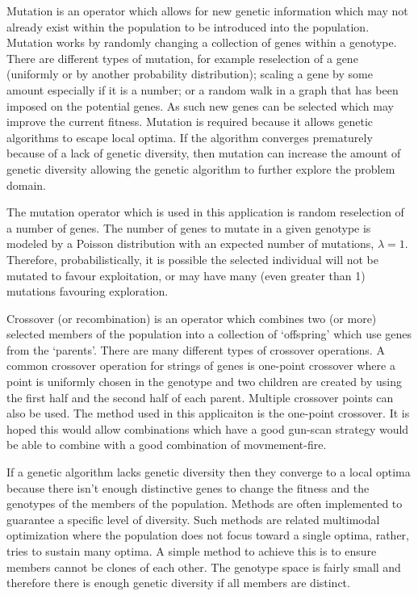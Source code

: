 Mutation is an operator which allows for new genetic information which may not already exist within the population to be introduced into the population. Mutation works by randomly changing a collection of genes within a genotype. There are different types of mutation, for example reselection of a gene (uniformly or by another probability distribution); scaling a gene by some amount especially if it is a number; or a random walk in a graph that has been imposed on the potential genes. As such new genes can be selected which may improve the current fitness. Mutation is required because it allows genetic algorithms to escape local optima. If the algorithm converges prematurely because of a lack of genetic diversity, then mutation can increase the amount of genetic diversity allowing the genetic algorithm to further explore the problem domain.

The mutation operator which is used in this application is random reselection of a number of genes. The number of genes to mutate in a given genotype is modeled by a Poisson distribution with an expected number of mutations, $\lambda = 1$. Therefore, probabilistically, it is possible the selected individual will not be mutated to favour exploitation, or may have many (even greater than 1)  mutations favouring exploration.

Crossover (or recombination) is an operator which combines two (or more) selected members of the population into a collection of `offspring' which use genes from the `parents'. There are many different types of crossover operations. A common crossover operation for strings of genes is one-point crossover where a point is uniformly chosen in the genotype and two children are created by using the first half and the second half of each parent. Multiple crossover points can also be used. The method used in this applicaiton is the one-point crossover. It is hoped this would allow combinations which have a good gun-scan strategy would be able to combine with a good combination of movmement-fire.

If a genetic algorithm lacks genetic diversity then they converge to a local optima because there isn't enough distinctive genes to change the fitness and the genotypes of the members of the population. Methods are often implemented to guarantee a specific level of diversity. Such methods are related multimodal optimization where the population does not focus toward a single optima, rather, tries to sustain many optima. A simple method to achieve this is to ensure members cannot be clones of each other. The genotype space is fairly small and therefore there is enough genetic diversity if all members are distinct.
